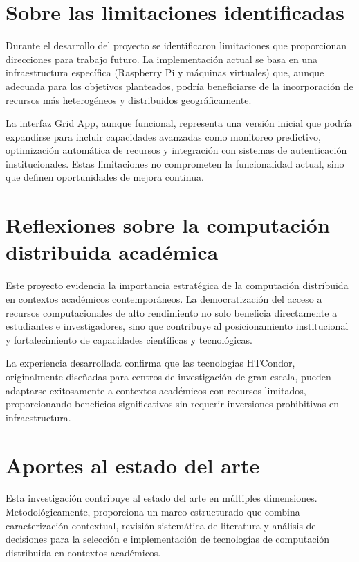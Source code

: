 \section{Sobre las limitaciones identificadas}
\noindent

Durante el desarrollo del proyecto se identificaron limitaciones que proporcionan direcciones para trabajo futuro. La implementación actual se basa en una infraestructura específica (Raspberry Pi y máquinas virtuales) que, aunque adecuada para los objetivos planteados, podría beneficiarse de la incorporación de recursos más heterogéneos y distribuidos geográficamente.

La interfaz Grid App, aunque funcional, representa una versión inicial que podría expandirse para incluir capacidades avanzadas como monitoreo predictivo, optimización automática de recursos y integración con sistemas de autenticación institucionales. Estas limitaciones no comprometen la funcionalidad actual, sino que definen oportunidades de mejora continua.

\section{Reflexiones sobre la computación distribuida académica}
\noindent

Este proyecto evidencia la importancia estratégica de la computación distribuida en contextos académicos contemporáneos. La democratización del acceso a recursos computacionales de alto rendimiento no solo beneficia directamente a estudiantes e investigadores, sino que contribuye al posicionamiento institucional y fortalecimiento de capacidades científicas y tecnológicas.

La experiencia desarrollada confirma que las tecnologías HTCondor, originalmente diseñadas para centros de investigación de gran escala, pueden adaptarse exitosamente a contextos académicos con recursos limitados, proporcionando beneficios significativos sin requerir inversiones prohibitivas en infraestructura.

\section{Aportes al estado del arte}
\noindent

Esta investigación contribuye al estado del arte en múltiples dimensiones. Metodológicamente, proporciona un marco estructurado que combina caracterización contextual, revisión sistemática de literatura y análisis de decisiones para la selección e implementación de tecnologías de computación distribuida en contextos académicos.

